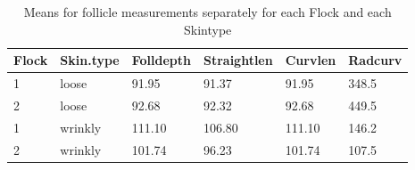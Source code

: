 %

\begin{table}[ht]
\centering
\caption{Means for follicle measurements separately for each Flock and each Skintype}
\label{tab:means}
\vspace{0.1in}
\begin{tabular}{|p{0.5in}|p{0.6in}|p{0.6in}|p{0.6in}|p{0.6in}|p{0.6in}|} \hline
  Flock & Skin.type & Folldepth & Straightlen & Curvlen  & Radcurv\\   
    \hline
  1 & loose & 91.95 & 91.37 & 91.95 & 348.5  \\ 
  2 & loose & 92.68 & 92.32 & 92.68 & 449.5  \\ 
  1 & wrinkly & 111.10 & 106.80 & 111.10 & 146.2 \\ 
  2 & wrinkly & 101.74 & 96.23 & 101.74 & 107.5  \\ 
   \hline
\end{tabular}
\end{table}

%


